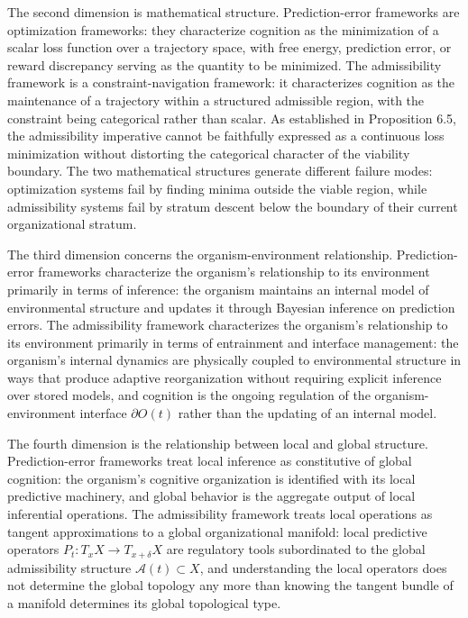\documentclass[12pt,a4paper]{report}
\theoremstyle{flyxion}
\begin{document}
The second dimension is mathematical structure. Prediction-error frameworks are optimization frameworks: they characterize cognition as the minimization of a scalar loss function over a trajectory space, with free energy, prediction error, or reward discrepancy serving as the quantity to be minimized. The admissibility framework is a constraint-navigation framework: it characterizes cognition as the maintenance of a trajectory within a structured admissible region, with the constraint being categorical rather than scalar. As established in Proposition 6.5, the admissibility imperative cannot be faithfully expressed as a continuous loss minimization without distorting the categorical character of the viability boundary. The two mathematical structures generate different failure modes: optimization systems fail by finding minima outside the viable region, while admissibility systems fail by stratum descent below the boundary of their current organizational stratum.

The third dimension concerns the organism-environment relationship. Prediction-error frameworks characterize the organism's relationship to its environment primarily in terms of inference: the organism maintains an internal model of environmental structure and updates it through Bayesian inference on prediction errors. The admissibility framework characterizes the organism's relationship to its environment primarily in terms of entrainment and interface management: the organism's internal dynamics are physically coupled to environmental structure in ways that produce adaptive reorganization without requiring explicit inference over stored models, and cognition is the ongoing regulation of the organism-environment interface $\partial O(t)$ rather than the updating of an internal model.

The fourth dimension is the relationship between local and global structure. Prediction-error frameworks treat local inference as constitutive of global cognition: the organism's cognitive organization is identified with its local predictive machinery, and global behavior is the aggregate output of local inferential operations. The admissibility framework treats local operations as tangent approximations to a global organizational manifold: local predictive operators $P_t : T_x X \rightarrow T_{x+\delta}X$ are regulatory tools subordinated to the global admissibility structure $\mathcal{A}(t) \subset X$, and understanding the local operators does not determine the global topology any more than knowing the tangent bundle of a manifold determines its global topological type.
\end{document}
